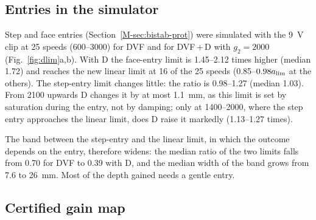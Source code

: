 \subsection{Entries in the simulator}\label{supp:delayed-entry}

Step and face entries (Section~\ref{M-sec:bistab-prot}) were simulated with the \SI{9}{\volt} clip at 25 speeds (\SIrange{600}{3000}{\rpm}) for DVF and for DVF\,+\,D with $g_2=2000$ (Fig.~\ref{fig:dlim}a,b). With D the face-entry limit is 1.45--2.12 times higher (median 1.72) and reaches the new linear limit at 16 of the 25 speeds (0.85--$0.98a_{\lim}$ at the others). The step-entry limit changes little: the ratio is 0.98--1.27 (median 1.03). From \SI{2100}{\rpm} upwards D changes it by at most \SI{1.1}{\milli\metre}, as this limit is set by saturation during the entry, not by damping; only at \SIrange{1400}{2000}{\rpm}, where the step entry approaches the linear limit, does D raise it markedly (1.13--1.27 times).

The band between the step-entry and the linear limit, in which the outcome depends on the entry, therefore widens: the median ratio of the two limits falls from 0.70 for DVF to 0.39 with D, and the median width of the band grows from 7.6 to \SI{26}{\milli\metre}. Most of the depth gained needs a gentle entry.

\subsection{Certified gain map}\label{supp:delayed-map}


